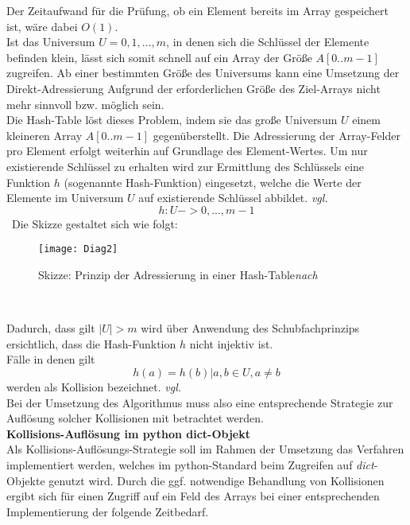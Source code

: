 \documentclass[
10pt, %
a4paper, %
oneside, %
headinclude,footinclude, %
BCOR5mm, %
]{scrartcl}
\begin{document}
Der Zeitaufwand für die Prüfung, ob ein Element bereits im Array gespeichert ist, wäre dabei \(O(1)\).\\
Ist das Universum \(U={0,1,...,m}\), in denen sich die Schlüssel der Elemente befinden klein, lässt sich somit schnell auf ein Array der Größe \(A[0..m-1]\) zugreifen. Ab einer bestimmten Größe des Universums kann eine Umsetzung der Direkt-Adressierung Aufgrund der erforderlichen Größe des Ziel-Arrays nicht mehr sinnvoll bzw. möglich sein.\\
Die Hash-Table löst dieses Problem, indem sie das große Universum \(U\) einem kleineren Array \(A[0..m-1]\) gegenüberstellt. Die Adressierung der Array-Felder pro Element erfolgt weiterhin auf Grundlage des Element-Wertes. Um nur existierende Schlüssel zu erhalten wird zur Ermittlung des Schlüssels eine Funktion \(h\) (sogenannte Hash-Funktion) eingesetzt, welche die Werte der Elemente im Universum \(U\) auf existierende Schlüssel abbildet. \textit{vgl.}\cite{Cormen:2009:IAT:1614191}
\begin{equation}
h: U-> {0,...,m-1}
\end{equation}\
Die Skizze gestaltet sich wie folgt:\\
\begin{figure}[h!]
	\centering 
	\texttt{[image: Diag2]} 
	\caption[Skizze Adressierung in Hash-Table]{Skizze: Prinzip der Adressierung in einer Hash-Table\textit{nach} \cite{Cormen:2009:IAT:1614191}}
	
\end{figure}\

Dadurch, dass gilt \(|U|>m\) wird über Anwendung des Schubfachprinzips ersichtlich, dass die Hash-Funktion \(h\) nicht injektiv ist. \\
Fälle in denen gilt
\begin{equation}
h(a)=h(b)|a,b\in U, a\neq b
\end{equation}
werden als Kollision bezeichnet. \textit{vgl.}\cite{Cormen:2009:IAT:1614191}\\
Bei der Umsetzung des Algorithmus muss also eine entsprechende Strategie zur Auflösung solcher Kollisionen mit betrachtet werden.\\

\textbf{Kollisions-Auflösung im python dict-Objekt}\\
Als Kollisions-Auflösungs-Strategie soll im Rahmen der Umsetzung das Verfahren implementiert werden, welches im python-Standard beim Zugreifen auf \textit{dict}-Objekte genutzt wird. Durch die ggf. notwendige Behandlung von Kollisionen ergibt sich für einen Zugriff auf ein Feld des Arrays bei einer entsprechenden Implementierung der folgende Zeitbedarf.
\end{document}
